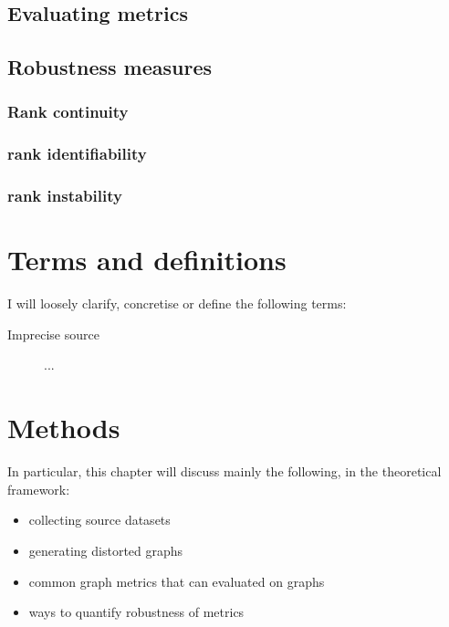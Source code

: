 \subsection{Evaluating metrics}

\subsection{Robustness measures}

\subsubsection{Rank continuity}\label{sub:rank_continuity}

\subsubsection{rank identifiability}

\subsubsection{rank instability}


\section{Terms and definitions}

I will loosely clarify, concretise or define the following terms:

\begin{description}
    \item[Imprecise source]
    ...
\end{description}


\section{Methods}

In particular, this chapter will discuss mainly the following, in the theoretical framework:
\begin{itemize}
    \item collecting source datasets
    \item generating distorted graphs
    \item common graph metrics that can evaluated on graphs
    \item ways to quantify robustness of metrics
\end{itemize}

